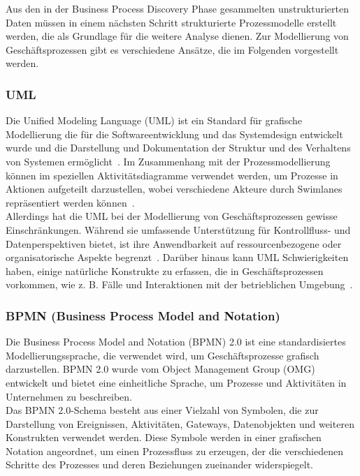 Aus den in der Business Process Discovery Phase gesammelten unstrukturierten Daten müssen in einem nächsten Schritt strukturierte Prozessmodelle erstellt werden, die als Grundlage für die weitere Analyse dienen.
Zur Modellierung von Geschäftsprozessen gibt es verschiedene Ansätze, die im Folgenden vorgestellt werden.

\subsubsection{UML}
Die Unified Modeling Language (UML) ist ein Standard für grafische Modellierung die für die Softwareentwicklung und das Systemdesign entwickelt wurde und die Darstellung und Dokumentation der Struktur und des Verhaltens von Systemen ermöglicht~\cite{OMG2017}.
Im Zusammenhang mit der Prozessmodellierung können im speziellen Aktivitätsdiagramme verwendet werden, um Prozesse in Aktionen aufgeteilt darzustellen, wobei verschiedene Akteure durch Swimlanes repräsentiert werden können~\cite{List2006}.\\

Allerdings hat die UML bei der Modellierung von Geschäftsprozessen gewisse Einschränkungen.
Während sie umfassende Unterstützung für Kontrollfluss- und Datenperspektiven bietet, ist ihre Anwendbarkeit auf ressourcenbezogene oder organisatorische Aspekte begrenzt~\cite{Russell2006}.
Darüber hinaus kann UML Schwierigkeiten haben, einige natürliche Konstrukte zu erfassen, die in Geschäftsprozessen vorkommen, wie z. B. Fälle und Interaktionen mit der betrieblichen Umgebung~\cite{Russell2006}.


\subsubsection{BPMN (Business Process Model and Notation)}

Die Business Process Model and Notation (BPMN) 2.0 ist eine standardisiertes Modellierungssprache, die verwendet wird, um Geschäftsprozesse grafisch darzustellen.
BPMN 2.0 wurde vom Object Management Group (OMG) entwickelt und bietet eine einheitliche Sprache, um Prozesse und Aktivitäten in Unternehmen zu beschreiben.\\
Das BPMN 2.0-Schema besteht aus einer Vielzahl von Symbolen, die zur Darstellung von Ereignissen, Aktivitäten, Gateways, Datenobjekten und weiteren Konstrukten verwendet werden.
Diese Symbole werden in einer grafischen Notation angeordnet, um einen Prozessfluss zu erzeugen, der die verschiedenen Schritte des Prozesses und deren Beziehungen zueinander widerspiegelt.

